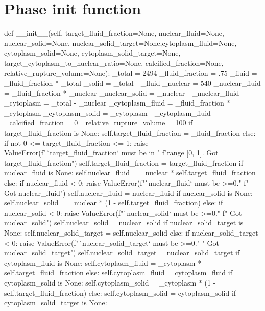 \section{Phase init function}\label{suplemental:vol:init}
\begin{python}\label{code:vol:init}
def __init__(self, target_fluid_fraction=None, nuclear_fluid=None, 
    nuclear_solid=None, 
    nuclear_solid_target=None,cytoplasm_fluid=None, 
    cytoplasm_solid=None,
    cytoplasm_solid_target=None, 
    target_cytoplasm_to_nuclear_ratio=None, 
    calcified_fraction=None, relative_rupture_volume=None):
    _total = 2494
    _fluid_fraction = .75
    _fluid = _fluid_fraction * _total
    _solid = _total - _fluid
    _nuclear = 540
    _nuclear_fluid = _fluid_fraction * _nuclear
    _nuclear_solid = _nuclear - _nuclear_fluid
    _cytoplasm = _total - _nuclear
    _cytoplasm_fluid = _fluid_fraction * _cytoplasm
    _cytoplasm_solid = _cytoplasm - _cytoplasm_fluid
    _calcified_fraction = 0
    _relative_rupture_volume = 100
    if target_fluid_fraction is None:
        self.target_fluid_fraction = _fluid_fraction
    else:
        if not 0 <= target_fluid_fraction <= 1:
            raise ValueError(f"`target_fluid_fraction` must be in "
                f"range [0, 1]. Got {target_fluid_fraction}")
        self.target_fluid_fraction = target_fluid_fraction
    if nuclear_fluid is None:
        self.nuclear_fluid = _nuclear * self.target_fluid_fraction
    else:
        if nuclear_fluid < 0:
            raise ValueError(f"`nuclear_fluid` must be >=0."
                f" Got {nuclear_fluid}")
        self.nuclear_fluid = nuclear_fluid
    if nuclear_solid is None:
        self.nuclear_solid = _nuclear * (1 - self.target_fluid_fraction)
    else:
        if nuclear_solid < 0:
            raise ValueError(f"`nuclear_solid` must be >=0."
                f" Got {nuclear_solid}")
        self.nuclear_solid = nuclear_solid
    if nuclear_solid_target is None:
        self.nuclear_solid_target = self.nuclear_solid
    else:
        if nuclear_solid_target < 0:
            raise ValueError(f"`nuclear_solid_target` must be >=0."
                " Got {nuclear_solid_target}")
        self.nuclear_solid_target = nuclear_solid_target
    if cytoplasm_fluid is None:
        self.cytoplasm_fluid = _cytoplasm * self.target_fluid_fraction
    else:
        self.cytoplasm_fluid = cytoplasm_fluid
    if cytoplasm_solid is None:
        self.cytoplasm_solid = _cytoplasm * (1 - self.target_fluid_fraction)
    else:
        self.cytoplasm_solid = cytoplasm_solid
    if cytoplasm_solid_target is None:

\end{python}

